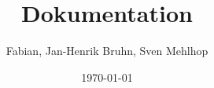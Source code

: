 \documentclass[a4paper,titlepage]{scrartcl}
\begin{document}
	
	\title{Dokumentation}
	\author{Fabian, Jan-Henrik Bruhn, Sven Mehlhop} 
	\date{\today} 
	\maketitle
	\tableofcontents
	
	
	
	
	
	
\end{document}
